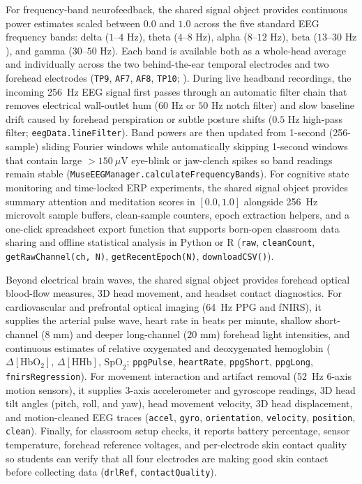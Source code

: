 \documentclass[11pt]{article}
\begin{document}
For frequency-band neurofeedback, the shared signal object provides continuous power estimates scaled between $0.0$ and $1.0$ across the five standard EEG frequency bands: delta ($1\text{--}4\text{ Hz}$), theta ($4\text{--}8\text{ Hz}$), alpha ($8\text{--}12\text{ Hz}$), beta ($13\text{--}30\text{ Hz}$), and gamma ($30\text{--}50\text{ Hz}$). Each band is available both as a whole-head average and individually across the two behind-the-ear temporal electrodes and two forehead electrodes (\texttt{TP9}, \texttt{AF7}, \texttt{AF8}, \texttt{TP10}; \citealp{cannard2021validating,sabio2024scoping}). During live headband recordings, the incoming 256~Hz EEG signal first passes through an automatic filter chain that removes electrical wall-outlet hum ($60\text{ Hz}$ or $50\text{ Hz}$ notch filter) and slow baseline drift caused by forehead perspiration or subtle posture shifts ($0.5\text{ Hz}$ high-pass filter; \texttt{eegData.lineFilter}). Band powers are then updated from 1-second (256-sample) sliding Fourier windows while automatically skipping 1-second windows that contain large $>150\ \mu\text{V}$ eye-blink or jaw-clench spikes so band readings remain stable (\texttt{MuseEEGManager.calculateFrequencyBands}). For cognitive state monitoring and time-locked ERP experiments, the shared signal object provides summary attention and meditation scores in $[0.0, 1.0]$ alongside 256~Hz microvolt sample buffers, clean-sample counters, epoch extraction helpers, and a one-click spreadsheet export function that supports born-open classroom data sharing and offline statistical analysis in Python or R \citep{deleeuw2024datapipe,makowski2021neurokit2,cannard2024brainbeats} (\texttt{raw}, \texttt{cleanCount}, \texttt{getRawChannel(ch, N)}, \texttt{getRecentEpoch(N)}, \texttt{downloadCSV()}).

Beyond electrical brain waves, the shared signal object provides forehead optical blood-flow measures, 3D head movement, and headset contact diagnostics. For cardiovascular and prefrontal optical imaging (64~Hz PPG and fNIRS), it supplies the arterial pulse wave, heart rate in beats per minute, shallow short-channel ($8\text{ mm}$) and deeper long-channel ($20\text{ mm}$) forehead light intensities, and continuous estimates of relative oxygenated and deoxygenated hemoglobin ($\Delta[\text{HbO}_2]$, $\Delta[\text{HHb}]$, $\text{SpO}_2$; \texttt{ppgPulse}, \texttt{heartRate}, \texttt{ppgShort}, \texttt{ppgLong}, \texttt{fnirsRegression}). For movement interaction and artifact removal (52~Hz 6-axis motion sensors), it supplies 3-axis accelerometer and gyroscope readings, 3D head tilt angles (pitch, roll, and yaw), head movement velocity, 3D head displacement, and motion-cleaned EEG traces (\texttt{accel}, \texttt{gyro}, \texttt{orientation}, \texttt{velocity}, \texttt{position}, \texttt{clean}). Finally, for classroom setup checks, it reports battery percentage, sensor temperature, forehead reference voltages, and per-electrode skin contact quality so students can verify that all four electrodes are making good skin contact before collecting data (\texttt{drlRef}, \texttt{contactQuality}).
\end{document}

